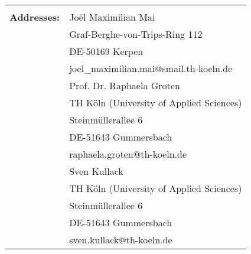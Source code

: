 \thispagestyle{empty}

\begin{center}
\begin{tabular}{rl}
							&  \\[26.0em]
							
\large \textbf{Addresses:}	&  	\quad Joël Maximilian Mai\\
							&  	\quad Graf-Berghe-von-Trips-Ring 112\\
							&	\quad DE-50169 Kerpen\\
							&  	\quad joel\_maximilian.mai@smail.th-koeln.de\\[2.0em]
							
							&  	\quad Prof. Dr. Raphaela Groten\\
							&  	\quad TH Köln (University of Applied Sciences)\\
							&  	\quad Steinmüllerallee 6\\
							&	\quad DE-51643 Gummersbach\\
							&  	\quad raphaela.groten@th-koeln.de\\[2.0em]
							
							&  	\quad Sven Kullack\\
							&  	\quad TH Köln (University of Applied Sciences)\\
							&  	\quad Steinmüllerallee 6\\
							&	\quad DE-51643 Gummersbach\\
							&  	\quad sven.kullack@th-koeln.de\\[2.0em]
\end{tabular}
\end{center}